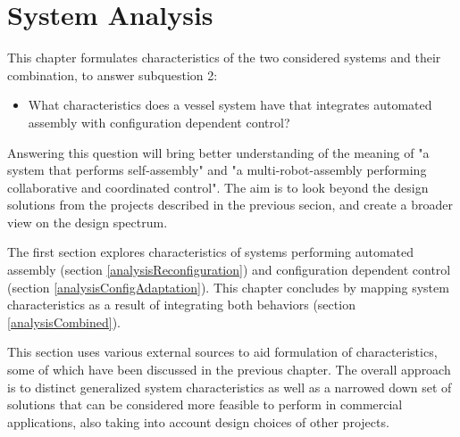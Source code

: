 \chapter{System Analysis}
\label{chap:sysAnalysis}

This chapter formulates characteristics of the two considered systems and their combination, to answer subquestion 2:

\begin{itemize}
\item What characteristics does a vessel system have that integrates automated assembly with configuration dependent control?
\end{itemize}

Answering this question will bring better understanding of the meaning of "a system that performs self-assembly" and "a multi-robot-assembly performing collaborative and coordinated control". The aim is to look beyond the design solutions from the projects described in the previous secion, and create a broader view on the design spectrum. 

The first section explores characteristics of systems performing automated assembly (section \ref{analysisReconfiguration}) and configuration dependent control (section \ref{analysisConfigAdaptation}).
This chapter concludes by mapping system characteristics as a result of integrating both behaviors (section \ref{analysisCombined}). 

This section uses various external sources to aid formulation of characteristics, some of which have been discussed in the previous chapter. 
The overall approach is to distinct generalized system characteristics as well as a narrowed down set of solutions that can be considered more feasible to perform in commercial applications, also taking into account design choices of other projects. 










